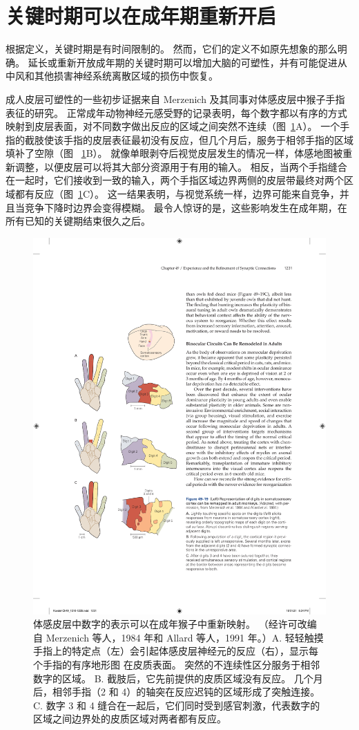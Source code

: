 \section{关键时期可以在成年期重新开启}

根据定义，关键时期是有时间限制的。
然而，它们的定义不如原先想象的那么明确。
延长或重新开放成年期的关键时期可以增加大脑的可塑性，并有可能促进从中风和其他损害神经系统离散区域的损伤中恢复。


成人皮层可塑性的一些初步证据来自 Merzenich 及其同事对体感皮层中猴子手指表征的研究。
正常成年动物神经元感受野的记录表明，每个数字都以有序的方式映射到皮层表面，对不同数字做出反应的区域之间突然不连续（图~\ref{fig:49_19}A）。
一个手指的截肢使该手指的皮层表征最初没有反应，但几个月后，服务于相邻手指的区域填补了空隙（图 ~\ref{fig:49_19}B）。
就像单眼剥夺后视觉皮层发生的情况一样，体感地图被重新调整，以便皮层可以将其大部分资源用于有用的输入。 相反，当两个手指缝合在一起时，它们接收到一致的输入，两个手指区域边界两侧的皮层带最终对两个区域都有反应（图~\ref{fig:49_19}C）。
这一结果表明，与视觉系统一样，边界可能来自竞争，并且当竞争下降时边界会变得模糊。
最令人惊讶的是，这些影响发生在成年期，在所有已知的关键期结束很久之后。


\begin{figure}[htbp]
	\centering
	\includegraphics[width=0.5\linewidth]{chap49/fig_49_19}
	\caption{体感皮层中数字的表示可以在成年猴子中重新映射。 （经许可改编自 Merzenich 等人，1984 年和 Allard 等人，1991 年。）A. 轻轻触摸手指上的特定点（左）会引起体感皮层神经元的反应（右），显示每个手指的有序地形图 在皮质表面。 突然的不连续性区分服务于相邻数字的区域。 B. 截肢后，它先前提供的皮质区域没有反应。 几个月后，相邻手指（2 和 4）的轴突在反应迟钝的区域形成了突触连接。 C. 数字 3 和 4 缝合在一起后，它们同时受到感官刺激，代表数字的区域之间边界处的皮质区域对两者都有反应。}
	\label{fig:49_19}
\end{figure}


